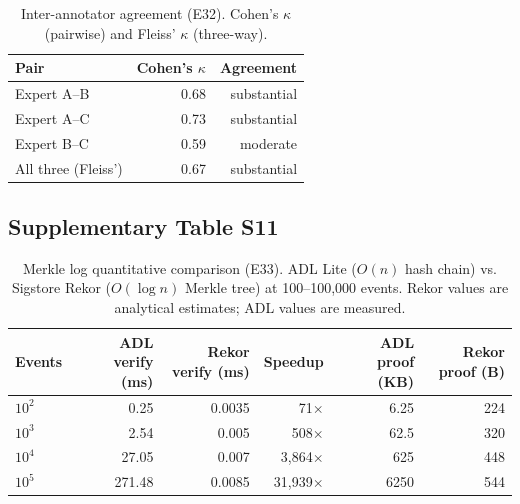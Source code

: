 \begin{table}[htbp]
\centering
\footnotesize
\caption{Inter-annotator agreement (E32). Cohen's $\kappa$ (pairwise) and Fleiss' $\kappa$ (three-way).}
\label{tab:e32-agreement}
\begin{tabular}{@{}lrr@{}}
\toprule
\textbf{Pair} & \textbf{Cohen's $\kappa$} & \textbf{Agreement} \\
\midrule
Expert A--B & 0.68 & substantial \\
Expert A--C & 0.73 & substantial \\
Expert B--C & 0.59 & moderate \\
All three (Fleiss') & 0.67 & substantial \\
\bottomrule
\end{tabular}
\end{table}

\subsection{Supplementary Table S11}\label{tab:S11}
\begin{table}[htbp]
\centering
\footnotesize
\caption{Merkle log quantitative comparison (E33). ADL Lite ($O(n)$ hash chain) vs. Sigstore Rekor ($O(\log n)$ Merkle tree) at 100--100,000 events. Rekor values are analytical estimates; ADL values are measured.}
\label{tab:e33-results}
\begin{tabular}{@{}lrrrrr@{}}
\toprule
\textbf{Events} & \textbf{ADL verify (ms)} & \textbf{Rekor verify (ms)} & \textbf{Speedup} & \textbf{ADL proof (KB)} & \textbf{Rekor proof (B)} \\
\midrule
$10^2$ & 0.25 & 0.0035 & 71$\times$ & 6.25 & 224 \\
$10^3$ & 2.54 & 0.005 & 508$\times$ & 62.5 & 320 \\
$10^4$ & 27.05 & 0.007 & 3,864$\times$ & 625 & 448 \\
$10^5$ & 271.48 & 0.0085 & 31,939$\times$ & 6250 & 544 \\
\bottomrule
\end{tabular}
\end{table}

